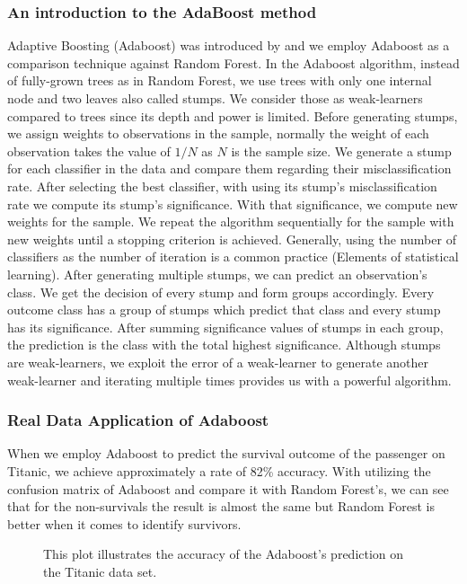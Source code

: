 \subsubsection{An introduction to the AdaBoost method}
Adaptive Boosting (Adaboost) was introduced by \cite{freund1997boosting} and we employ Adaboost as a comparison 
technique against Random Forest. In the Adaboost algorithm, instead of fully-grown trees as in Random Forest, 
we use trees with only one internal node and two leaves also called stumps. We consider those as weak-learners 
compared to trees since its depth and power is limited. Before generating stumps, 
we assign weights to observations in the sample, normally the weight of each observation takes the value 
of $1/N$ as $N$ is the sample size. We generate a stump for each classifier in the data and compare them regarding 
their misclassification rate. After selecting the best classifier, with using its stump's misclassification rate 
we compute its stump's significance. With that significance, we compute new weights for the sample. 
We repeat the algorithm sequentially for the sample with new weights until a stopping criterion is achieved. 
Generally, using the number of classifiers as the number of iteration is a common practice (Elements of statistical learning). 
After generating multiple stumps, we can predict an observation's class. 
We get the decision of every stump and form groups accordingly. 
Every outcome class has a group of stumps which predict that class and every stump has its significance. 
After summing significance values of stumps in each group, the prediction is the class with the total highest significance. 
Although stumps are weak-learners, we exploit the error of a weak-learner to generate another weak-learner 
and iterating multiple times provides us with a powerful algorithm.

\subsubsection{Real Data Application of Adaboost}
When we employ Adaboost to predict the survival outcome of the passenger on Titanic, we achieve approximately a rate of 82\% accuracy. With utilizing the confusion matrix of Adaboost and compare it with Random Forest's, we can see that for the non-survivals the result is almost the same but Random Forest is better when it comes to identify survivors.

\begin{figure}[H]
    \captionsetup{format=plain}
    \caption
        {This plot illustrates the accuracy of the Adaboost's prediction on the Titanic data set.
        }
    \label{fig:confusion_matrix_adaboost}
\end{figure}



